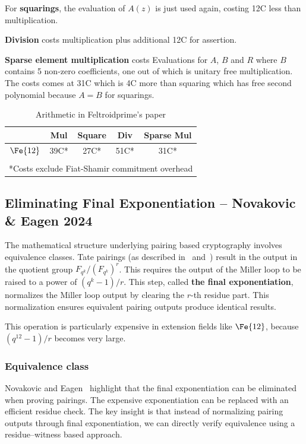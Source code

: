 For \textbf{squarings}, the evaluation of $A(z)$ is just used again, costing 12C less than multiplication.

\textbf{Division} costs multiplication plus additional 12C for assertion.

\textbf{Sparse element multiplication} costs Evaluations for $A$, $B$ and $R$ where $B$ contains 5 non-zero coefficients, one out of which is unitary free multiplication. The costs comes at 31C which is 4C more than squaring which has free second polynomial because $A = B$ for squarings.

\begin{table}[h]
\centering
\caption{Arithmetic in Feltroidprime's paper\cite{FXFM23}}
\label{tab:fq12_fxfm}
\begin{tabular}{|c|c|c|c|c|}
\hline
 & Mul & Square & Div & Sparse Mul \\
\hline
$\Fe{12}$ & 39C* & 27C* & 51C* & 31C* \\
\hline
\multicolumn{5}{|c|}{} \\
\multicolumn{5}{|c|}{*Costs exclude Fiat-Shamir commitment overhead} \\
\hline
\end{tabular}
\end{table}

\subsection{Eliminating Final Exponentiation -- Novakovic \& Eagen 2024}

The mathematical structure underlying pairing based cryptography involves equivalence classes. Tate pairings (as described in~\cite{OPP24} and~\cite{P4B19}) result in the output in the quotient group $F_{q^k}/(F_{q^k})^r$.
This requires the output of the Miller loop to be raised to a power of $(q^k-1)/r$. This step, called \textbf{the final exponentiation}, normalizes the Miller loop output by clearing the $r$-th residue part. This normalization ensures equivalent pairing outputs produce identical results.

This operation is particularly expensive in extension fields like $\Fe{12}$, because $(q^{12}-1)/r$ becomes very large.

\subsubsection{Equivalence class}

Novakovic and Eagen~\cite{OPP24} highlight that the final exponentiation can be eliminated when proving pairings. The expensive exponentiation can be replaced with an efficient residue check. The key insight is that instead of normalizing pairing outputs through final exponentiation, we can directly verify equivalence using a residue--witness based approach.

